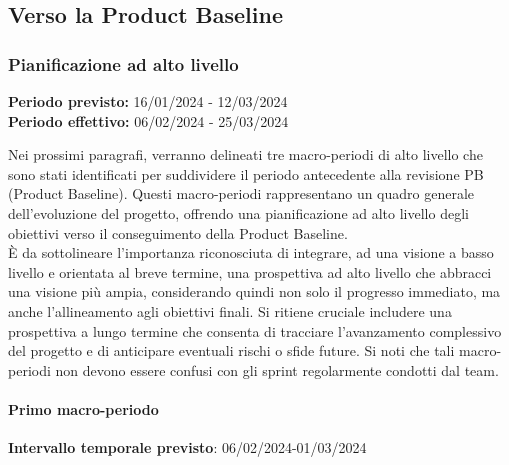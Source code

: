 \subsection{Verso la Product Baseline}

\subsubsection{Pianificazione ad alto livello}

\textbf{Periodo previsto:} 16/01/2024 - 12/03/2024 \\ 
\vspace{0.2cm} 
\textbf{Periodo effettivo:} 06/02/2024 - 25/03/2024 \\ 
\vspace{0.2cm} 

Nei prossimi paragrafi, verranno delineati tre macro-periodi di alto livello che sono stati identificati per suddividere il periodo antecedente alla revisione PB (Product Baseline). Questi macro-periodi rappresentano un quadro generale dell'evoluzione del progetto, offrendo una pianificazione ad alto livello degli obiettivi verso il conseguimento della Product Baseline. \\
È da sottolineare l'importanza riconosciuta di integrare, ad una visione a basso livello e orientata al breve termine, una prospettiva ad alto livello che abbracci una visione più ampia, considerando quindi non solo il progresso immediato, ma anche l'allineamento agli obiettivi finali. Si ritiene cruciale includere una prospettiva a lungo termine che consenta di tracciare l'avanzamento complessivo del progetto e di anticipare eventuali rischi o sfide future.
Si noti che tali macro-periodi non devono essere confusi con gli sprint regolarmente condotti dal team.

\paragraph{Primo macro-periodo}

\textbf{Intervallo temporale previsto}: 06/02/2024-01/03/2024 \\ 

\vspace{0.2cm}

